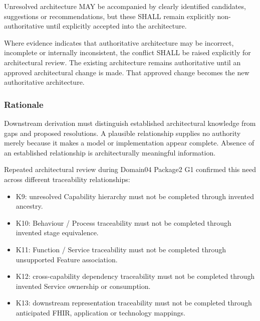 \label{rad:axioms:786}

Unresolved architecture MAY be accompanied by clearly identified candidates, suggestions or recommendations, but these SHALL remain explicitly non-authoritative until explicitly accepted into the architecture.

\label{rad:axioms:791}

Where evidence indicates that authoritative architecture may be incorrect, incomplete or internally inconsistent, the conflict SHALL be raised explicitly for architectural review. The existing architecture remains authoritative until an approved architectural change is made. That approved change becomes the new authoritative architecture.

\label{rad:axioms:797}
\subsubsection*{Rationale}
\label{rad:axioms:799}

Downstream derivation must distinguish established architectural knowledge from gaps and proposed resolutions. A plausible relationship supplies no authority merely because it makes a model or implementation appear complete. Absence of an established relationship is architecturally meaningful information.

\label{rad:axioms:805}

Repeated architectural review during Domain04 Package2 G1 confirmed this need across different traceability relationships:

\label{rad:axioms:808}

\begin{itemize}

\item 
K9: unresolved Capability hierarchy must not be completed through invented ancestry.



\item 
K10: Behaviour /\allowbreak{} Process traceability must not be completed through invented stage equivalence.



\item 
K11: Function /\allowbreak{} Service traceability must not be completed through unsupported Feature association.



\item 
K12: cross-capability dependency traceability must not be completed through invented Service ownership or consumption.



\item 
K13: downstream representation traceability must not be completed through anticipated FHIR, application or technology mappings.



\end{itemize}
\label{rad:axioms:819}

